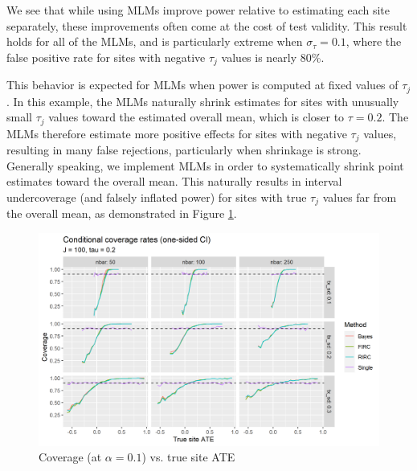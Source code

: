 \documentclass[]{article}
\begin{document}
We see that while using MLMs improve power relative to estimating each site separately, these improvements often come at the cost of test validity.
This result holds for all of the MLMs, and is particularly extreme when $\sigma_\tau = 0.1$, where the false positive rate for sites with negative $\tau_j$ values is nearly 80\%.

This behavior is expected for MLMs when power is computed at fixed values of $\tau_j$.
In this example, the MLMs naturally shrink estimates for sites with unusually small $\tau_j$ values toward the estimated overall mean, which is closer to $\tau = 0.2$.
The MLMs therefore estimate more positive effects for sites with negative $\tau_j$ values, resulting in many false rejections, particularly when shrinkage is strong.
Generally speaking, we implement MLMs in order to systematically shrink point estimates toward the overall mean.
This naturally results in interval undercoverage (and falsely inflated power) for sites with true $\tau_j$ values far from the overall mean, as demonstrated in Figure \ref{fig:coverage_plot}.
\begin{figure}[ht]
	\centering
	\includegraphics[width=\textwidth]{writeup/images/coverage_plot.png}
	\caption{Coverage (at $\alpha = 0.1$) vs. true site ATE}
	\label{fig:coverage_plot}
\end{figure}
\end{document}
